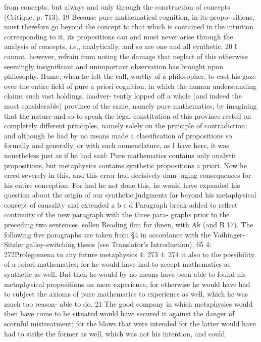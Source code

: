 from concepts, but always and only through the construction of concepts
(Critique, p. 713). 19 Because pure mathematical cognition, in its propo-
sitions, must therefore go beyond the concept to that which is contained
in the intuition corresponding to it, its propositions can and must never
arise through the analysis of concepts, i.e., analytically, and so are one
and all synthetic. 20
I cannot, however, refrain from noting the damage that neglect of
this otherwise seemingly insigniﬁcant and unimportant observation has
brought upon philosophy. Hume, when he felt the call, worthy of a
philosopher, to cast his gaze over the entire ﬁeld of pure a priori cognition,
in which the human understanding claims such vast holdings, inadver-
tently lopped off a whole (and indeed the most considerable) province
of the same, namely pure mathematics, by imagining that the nature and
so to speak the legal constitution of this province rested on completely
different principles, namely solely on the principle of contradiction; and
although he had by no means made a classiﬁcation of propositions so
formally and generally, or with such nomenclature, as I have here, it
was nonetheless just as if he had said: Pure mathematics contains only
analytic propositions, but metaphysics contains synthetic propositions a
priori. Now he erred severely in this, and this error had decisively dam-
aging consequences for his entire conception. For had he not done this,
he would have expanded his question about the origin of our synthetic
judgments far beyond his metaphysical concept of causality and extended
a
b
c
d
Paragraph break added to reﬂect continuity of the new paragraph with the three para-
graphs prior to the preceding two sentences.
sollen
Reading ihm for ihnen, with Ak (and B 17).
The following ﬁve paragraphs are taken from §4 in accordance with the Vaihinger-Sitzler
galley-switching thesis (see Translator’s Introduction).
65
4: 272Prolegomena to any future metaphysics
4: 273
4: 274
it also to the possibility of a priori mathematics; for he would have had
to accept mathematics as synthetic as well. But then he would by no
means have been able to found his metaphysical propositions on mere
experience, for otherwise he would have had to subject the axioms of
pure mathematics to experience as well, which he was much too reason-
able to do. 21 The good company in which metaphysics would then have
come to be situated would have secured it against the danger of scornful
mistreatment; for the blows that were intended for the latter would have
had to strike the former as well, which was not his intention, and could
